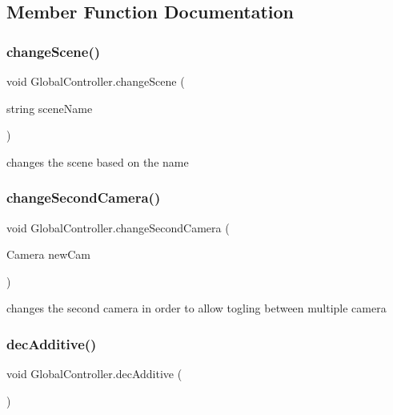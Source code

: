 \subsection{Member Function Documentation}
\mbox{\label{class_global_controller_af0ae9de1725a09bce4a16209a5b638ea}} 
\subsubsection{\texorpdfstring{change\+Scene()}{changeScene()}}
{\footnotesize\ttfamily void Global\+Controller.\+change\+Scene (\begin{DoxyParamCaption}\item[{string}]{scene\+Name }\end{DoxyParamCaption})}



changes the scene based on the name 

\mbox{\label{class_global_controller_a58e7beb6be20379f00ed7f63c0a1890a}} 
\subsubsection{\texorpdfstring{change\+Second\+Camera()}{changeSecondCamera()}}
{\footnotesize\ttfamily void Global\+Controller.\+change\+Second\+Camera (\begin{DoxyParamCaption}\item[{Camera}]{new\+Cam }\end{DoxyParamCaption})}



changes the second camera in order to allow togling between multiple camera 

\mbox{\label{class_global_controller_aca3ee9a56dbfaeaf1af53422d6afea44}} 
\subsubsection{\texorpdfstring{dec\+Additive()}{decAdditive()}}
{\footnotesize\ttfamily void Global\+Controller.\+dec\+Additive (\begin{DoxyParamCaption}{ }\end{DoxyParamCaption})}



